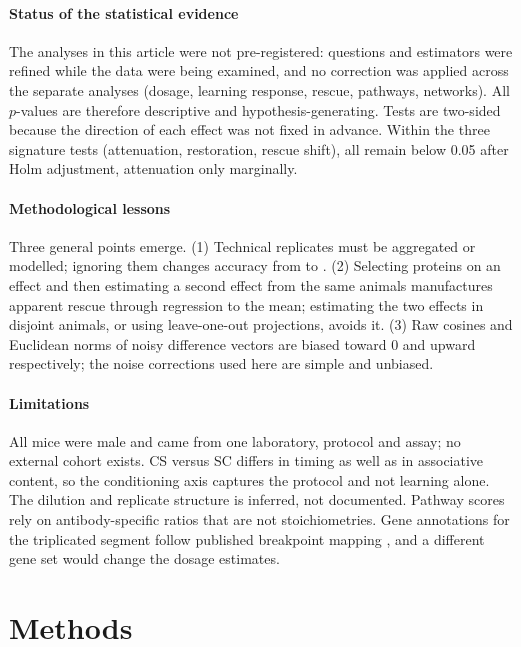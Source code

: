 \documentclass[10pt]{article}
\begin{document}
\paragraph{Status of the statistical evidence} The analyses in this article were not
pre-registered: questions and estimators were refined while the data were being examined, and
no correction was applied across the separate analyses (dosage, learning response, rescue,
pathways, networks). All $p$-values are therefore descriptive and hypothesis-generating. Tests
are two-sided because the direction of each effect was not fixed in advance. Within the three
signature tests (attenuation, restoration, rescue shift), all remain below 0.05 after Holm
adjustment, attenuation only marginally.

\paragraph{Methodological lessons} Three general points emerge. (1) Technical replicates must be
aggregated or modelled; ignoring them changes accuracy from \GroupedBA{} to \RowBA. (2) Selecting
proteins on an effect and then estimating a second effect from the same animals manufactures
apparent rescue through regression to the mean; estimating the two effects in disjoint animals,
or using leave-one-out projections, avoids it. (3) Raw cosines and Euclidean norms of noisy
difference vectors are biased toward 0 and upward respectively; the noise corrections used here
are simple and unbiased.

\paragraph{Limitations} All mice were male and came from one laboratory, protocol and assay; no
external cohort exists. CS versus SC differs in timing as well as in associative content, so the
conditioning axis captures the protocol and not learning alone. The dilution and replicate
structure is inferred, not documented. Pathway scores rely on antibody-specific ratios that are
not stoichiometries. Gene annotations for the triplicated segment follow published breakpoint
mapping \cite{duchon2011, reinholdt2011}, and a different gene set would change the dosage
estimates.

\section{Methods}
\end{document}
